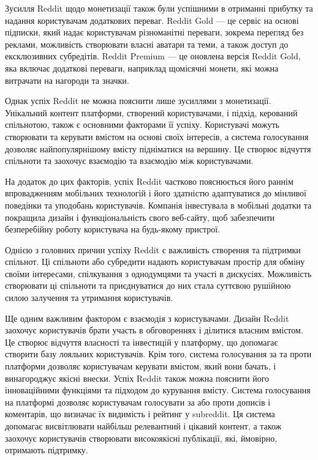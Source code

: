 \documentclass[oneside,14pt]{extarticle}
\begin{document}
Зусилля Reddit щодо монетизації також були успішними в отриманні прибутку та надання користувачам додаткових переваг. Reddit Gold — це сервіс на основі підписки, який надає користувачам різноманітні переваги, зокрема перегляд без реклами, можливість створювати власні аватари та теми, а також доступ до ексклюзивних субредітів. Reddit Premium — це оновлена версія Reddit Gold, яка включає додаткові переваги, наприклад щомісячні монети, які можна витрачати на нагороди та значки.

Однак успіх Reddit не можна пояснити лише зусиллями з монетизації. Унікальний контент платформи, створений користувачами, і підхід, керований спільнотою, також є основними факторами її успіху. Користувачі можуть створювати та керувати вмістом на основі своїх інтересів, а система голосування дозволяє найпопулярнішому вмісту підніматися на вершину. Це створює відчуття спільноти та заохочує взаємодію та взаємодію між користувачами.

На додаток до цих факторів, успіх Reddit частково пояснюється його раннім впровадженням мобільних технологій і його здатністю адаптуватися до мінливої поведінки та уподобань користувачів. Компанія інвестувала в мобільні додатки та покращила дизайн і функціональність свого веб-сайту, щоб забезпечити безперебійну роботу користувача на будь-якому пристрої.

Однією з головних причин успіху Reddit є важливість створення та підтримки спільнот. Ці спільноти або субредити надають користувачам простір для обміну своїми інтересами, спілкування з однодумцями та участі в дискусіях. Можливість створювати ці спільноти та приєднуватися до них стала суттєвою рушійною силою залучення та утримання користувачів.

Ще одним важливим фактором є взаємодія з користувачами. Дизайн Reddit заохочує користувачів брати участь в обговореннях і ділитися власним вмістом. Це створює відчуття власності та інвестицій у платформу, що допомагає створити базу лояльних користувачів. Крім того, система голосування за та проти платформи дозволяє користувачам керувати вмістом, який вони бачать, і винагороджує якісні внески.
Успіх Reddit також можна пояснити його інноваційними функціями та підходом до курування вмісту. Система голосування на платформі дозволяє користувачам голосувати за або проти дописів і коментарів, що визначає їх видимість і рейтинг у subreddit. Ця система допомагає висвітлювати найбільш релевантний і цікавий контент, а також заохочує користувачів створювати високоякісні публікації, які, ймовірно, отримають підтримку.
\end{document}

